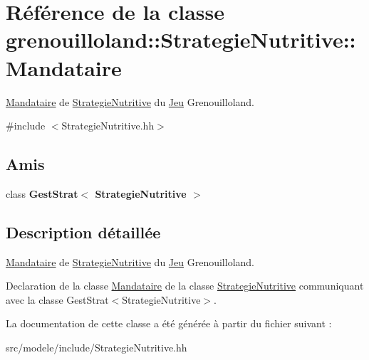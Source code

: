 \hypertarget{classgrenouilloland_1_1StrategieNutritive_1_1Mandataire}{\section{Référence de la classe grenouilloland\-:\-:Strategie\-Nutritive\-:\-:Mandataire}
\label{classgrenouilloland_1_1StrategieNutritive_1_1Mandataire}
}


\hyperlink{classgrenouilloland_1_1StrategieNutritive_1_1Mandataire}{Mandataire} de \hyperlink{classgrenouilloland_1_1StrategieNutritive}{Strategie\-Nutritive} du \hyperlink{classgrenouilloland_1_1Jeu}{Jeu} Grenouilloland.  




{\ttfamily \#include $<$Strategie\-Nutritive.\-hh$>$}

\subsection*{Amis}
\begin{DoxyCompactItemize}
\item 
\hypertarget{classgrenouilloland_1_1StrategieNutritive_1_1Mandataire_a8cca64b57871c0ddef42f5ac5e020592}{class {\bfseries Gest\-Strat$<$ Strategie\-Nutritive $>$}}\label{classgrenouilloland_1_1StrategieNutritive_1_1Mandataire_a8cca64b57871c0ddef42f5ac5e020592}

\end{DoxyCompactItemize}


\subsection{Description détaillée}
\hyperlink{classgrenouilloland_1_1StrategieNutritive_1_1Mandataire}{Mandataire} de \hyperlink{classgrenouilloland_1_1StrategieNutritive}{Strategie\-Nutritive} du \hyperlink{classgrenouilloland_1_1Jeu}{Jeu} Grenouilloland. 

Declaration de la classe \hyperlink{classgrenouilloland_1_1StrategieNutritive_1_1Mandataire}{Mandataire} de la classe \hyperlink{classgrenouilloland_1_1StrategieNutritive}{Strategie\-Nutritive} communiquant avec la classe Gest\-Strat$<$\-Strategie\-Nutritive$>$. 

La documentation de cette classe a été générée à partir du fichier suivant \-:\begin{DoxyCompactItemize}
\item 
src/modele/include/Strategie\-Nutritive.\-hh\end{DoxyCompactItemize}
